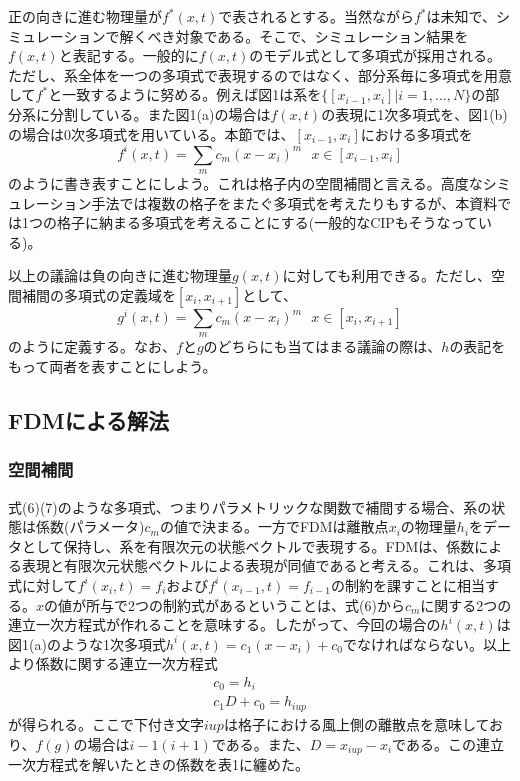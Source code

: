 \documentclass[dvipdfmx, 9pt, a4paper]{jsarticle}
\begin{document}
正の向きに進む物理量が$f^*(x, t)$で表されるとする。当然ながら$f^*$は未知で、シミュレーションで解くべき対象である。そこで、シミュレーション結果を$f(x, t)$と表記する。一般的に$f(x, t)$のモデル式として多項式が採用される。ただし、系全体を一つの多項式で表現するのではなく、部分系毎に多項式を用意して$f^*$と一致するように努める。例えば図1は系を$\{[x_{i-1}, x_{i}] | i=1, ..., N\}$の部分系に分割している。また図1(a)の場合は$f(x, t)$の表現に1次多項式を、図1(b)の場合は0次多項式を用いている。本節では、$[x_{i-1}, x_i]$における多項式を\begin{equation}
f^i(x, t)=\sum_m c_m (x-x_i)^m~~~x \in [x_{i-1}, x_i]
\end{equation}
のように書き表すことにしよう。これは格子内の空間補間と言える。高度なシミュレーション手法では複数の格子をまたぐ多項式を考えたりもするが、本資料では1つの格子に納まる多項式を考えることにする(一般的なCIPもそうなっている)。\par
以上の議論は負の向きに進む物理量$g(x, t)$に対しても利用できる。ただし、空間補間の多項式の定義域を$[x_i, x_{i+1}]$として、
\begin{equation}
g^i(x, t)=\sum_m c_m (x-x_i)^m~~~x \in [x_i, x_{i+1}]
\end{equation}
のように定義する。なお、$f$と$g$のどちらにも当てはまる議論の際は、$h$の表記をもって両者を表すことにしよう。

\subsection{FDMによる解法}
\subsubsection{空間補間}
式(6)(7)のような多項式、つまりパラメトリックな関数で補間する場合、系の状態は係数(パラメータ)$c_m$の値で決まる。一方でFDMは離散点$x_i$の物理量$h_i$をデータとして保持し、系を有限次元の状態ベクトルで表現する。FDMは、係数による表現と有限次元状態ベクトルによる表現が同値であると考える。これは、多項式に対して$f^i(x_i, t)=f_i$および$f^i(x_{i-1},t)=f_{i-1}$の制約を課すことに相当する。$x$の値が所与で2つの制約式があるということは、式(6)から$c_m$に関する2つの連立一次方程式が作れることを意味する。したがって、今回の場合の$h^i(x, t)$は図1(a)のような1次多項式$h^i(x, t)=c_1(x-x_i)+c_0$でなければならない。以上より係数に関する連立一次方程式
\begin{equation}
\begin{array}{l}
c_0=h_i \\
c_1D+c_0=h_{iup}
\end{array}
\end{equation}
が得られる。ここで下付き文字$iup$は格子における風上側の離散点を意味しており、$f(g)$の場合は$i-1(i+1)$である。また、$D=x_{iup}-x_i$である。この連立一次方程式を解いたときの係数を表1に纏めた。
\end{document}
